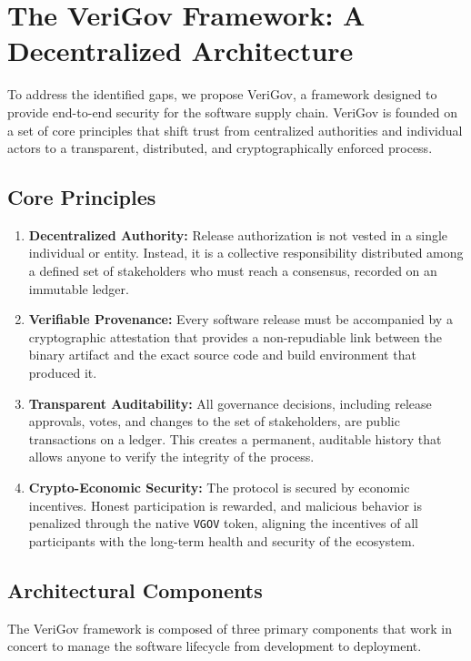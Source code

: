 \documentclass{article}
\begin{document}
\section{The VeriGov Framework: A Decentralized Architecture}
\label{sec:the-verigov-framework-a-decentralized-architectu}

To address the identified gaps, we propose VeriGov, a framework designed to provide end-to-end security for the software supply chain. VeriGov is founded on a set of core principles that shift trust from centralized authorities and individual actors to a transparent, distributed, and cryptographically enforced process.

\subsection{Core Principles}

\begin{enumerate}
\item \textbf{Decentralized Authority:} Release authorization is not vested in a single individual or entity. Instead, it is a collective responsibility distributed among a defined set of stakeholders who must reach a consensus, recorded on an immutable ledger.
\item \textbf{Verifiable Provenance:} Every software release must be accompanied by a cryptographic attestation that provides a non-repudiable link between the binary artifact and the exact source code and build environment that produced it.
\item \textbf{Transparent Auditability:} All governance decisions, including release approvals, votes, and changes to the set of stakeholders, are public transactions on a ledger. This creates a permanent, auditable history that allows anyone to verify the integrity of the process.
\item \textbf{Crypto-Economic Security:} The protocol is secured by economic incentives. Honest participation is rewarded, and malicious behavior is penalized through the native \lstinline{VGOV} token, aligning the incentives of all participants with the long-term health and security of the ecosystem.~\cite{buterin2017casper}
\end{enumerate}

\subsection{Architectural Components}

The VeriGov framework is composed of three primary components that work in concert to manage the software lifecycle from development to deployment.
\end{document}

